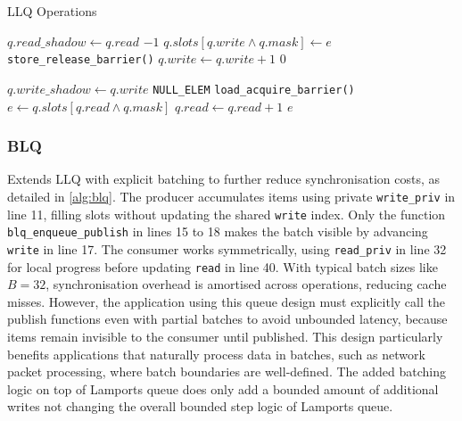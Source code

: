 \begin{algorithm}[!ht]
    \centering
    \captionsetup{justification=centering}
    \caption{\ac{LLQ} Operations \cite{MaffioneCacheAware}}
    \label{alg:llq}
    \scriptsize
    \begin{algorithmic}[1]
             
                \State $q.read\_shadow \gets q.read$ 
                    \State \Return $-1$ 
                \EndIf
            \EndIf
            \State $q.slots[q.write \land q.mask] \gets e$
            \State \texttt{store\_release\_barrier()}
            \State $q.write \gets q.write + 1$
            \State \Return $0$
        \EndFunction
        
        \State
        
             
                \State $q.write\_shadow \gets q.write$ 
                    \State \Return \texttt{NULL\_ELEM}
                \EndIf
            \EndIf
            \State \texttt{load\_acquire\_barrier()}
            \State $e \gets q.slots[q.read \land q.mask]$
            \State $q.read \gets q.read + 1$
            \State \Return $e$
        \EndFunction
    \end{algorithmic}
\end{algorithm}

\subsubsection{\acf{BLQ}}
Extends \ac{LLQ} with explicit batching to further reduce synchronisation costs, as detailed in \cref{alg:blq}. The producer accumulates items using private \texttt{write\_priv} in line 11, filling slots without updating the shared \texttt{write} index. Only the function \texttt{blq\_enqueue\_publish} in lines 15 to 18 makes the batch visible by advancing \texttt{write} in line 17. The consumer works symmetrically, using \texttt{read\_priv} in line 32 for local progress before updating \texttt{read} in line 40. With typical batch sizes like $B = 32$, synchronisation overhead is amortised across operations, reducing cache misses. However, the application using this queue design must explicitly call the publish functions even with partial batches to avoid unbounded latency, because items remain invisible to the consumer until published. This design particularly benefits applications that naturally process data in batches, such as network packet processing, where batch boundaries are well-defined. The added batching logic on top of Lamports queue does only add a bounded amount of additional writes not changing the overall bounded step logic of Lamports queue. \cite{MaffioneCacheAware}

